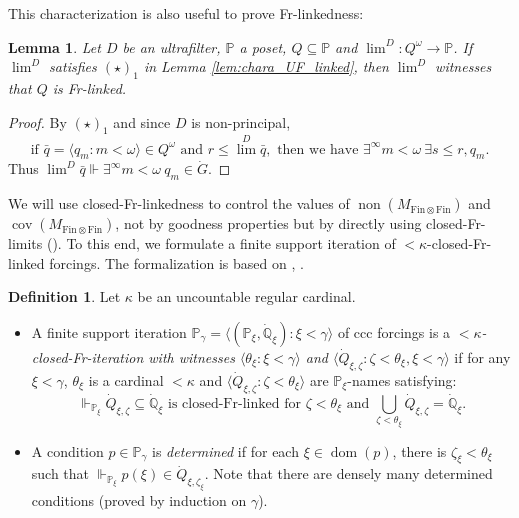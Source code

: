 \documentclass[a4paper,12pt]{amsart}
\newtheorem{lem}[thm]{Lemma}
\theoremstyle{definition}
\newtheorem{dfn}[thm]{Definition}
\numberwithin{thm}{section}
\numberwithin{equation}{section}
\newcommand{\p}{\mathbb{P}}
\newcommand{\qd}{\dot{\mathbb{Q}}}
\DeclareMathOperator{\non}{non}
\DeclareMathOperator{\cov}{cov}
\DeclareMathOperator{\dom}{dom}
\newcommand{\finfin}{\mathrm{Fin}\otimes\mathrm{Fin}}
\begin{document}
    This characterization is also useful to prove Fr-linkedness:
    
    \begin{lem}
    	\label{lem:Fr_linked_star_one}
    	Let $D$ be an ultrafilter, $\p$ a poset, $Q\subseteq\p$ and $\lim^D\colon Q^\omega\to\p$.
    	If $\lim^D$ satisfies $(\star)_1$ in Lemma \ref{lem:chara_UF_linked}, then  $\lim^D$ witnesses that $Q$ is Fr-linked.
    \end{lem}
    \begin{proof}
    	By $(\star)_1$ and since $D$ is non-principal,
    	\[\text{if }\bar{q}=\langle q_m:m<\omega\rangle\in Q^\omega\text{ and }r\leq\textstyle{\lim^D}\bar{q},\text{ then we have }\exists^\infty m<\omega~\exists s\leq r,q_m.\]
    	Thus $\textstyle{\lim^D\bar{q}} \Vdash \exists^\infty m<\omega~q_m \in \dot{G}$.
    \end{proof}
    
    We will use closed-Fr-linkedness to control the values of $\non(M_{\finfin})$ and $\cov(M_{\finfin})$, not by goodness properties but by directly using closed-Fr-limits (). To this end, we formulate a finite support iteration of ${<}\kappa$-closed-Fr-linked forcings. The formalization is based on \cite{Mej19}, \cite{CGHY24}.
    
    \begin{dfn}
    	\label{dfn:Gamma_iteration}
        Let $\kappa$ be an uncountable regular cardinal.
    	\begin{itemize}
    		\item 
    		A finite support iteration $\p_\gamma=\langle(\p_\xi,\qd_\xi):\xi<\gamma\rangle $ of ccc forcings is a \emph{${<}\kappa$-closed-Fr-iteration with witnesses $\langle\theta_\xi:\xi<\gamma\rangle$ and $\langle\dot{Q}_{\xi,\zeta}:\zeta<\theta_\xi,\xi<\gamma\rangle$} if for any $\xi<\gamma$, $\theta_\xi$ is a cardinal $<\kappa$ and
    		$\langle\dot{Q}_{\xi,\zeta}:\zeta<\theta_\xi\rangle$ are $\p_\xi$-names satisfying: 
    		\[
    		\Vdash_{\p_\xi}\dot{Q}_{\xi,\zeta}\subseteq\qd_\xi\text{ is closed-Fr-linked for }\zeta<\theta_\xi\text{ and }\bigcup_{\zeta<\theta_\xi}\dot{Q}_{\xi,\zeta}=\qd_\xi.
    		\]
    		\item A condition $p\in\p_\gamma$ is \emph{determined} if for each $\xi\in\dom(p)$, there is $\zeta_\xi<\theta_\xi$ such that  $\Vdash_{\p_\xi} p(\xi)\in \dot{Q}_{\xi,\zeta_\xi}$. Note that there are densely many determined conditions (proved by induction on $\gamma$).
    		
    	\end{itemize}
    \end{dfn}
    
\end{document}
